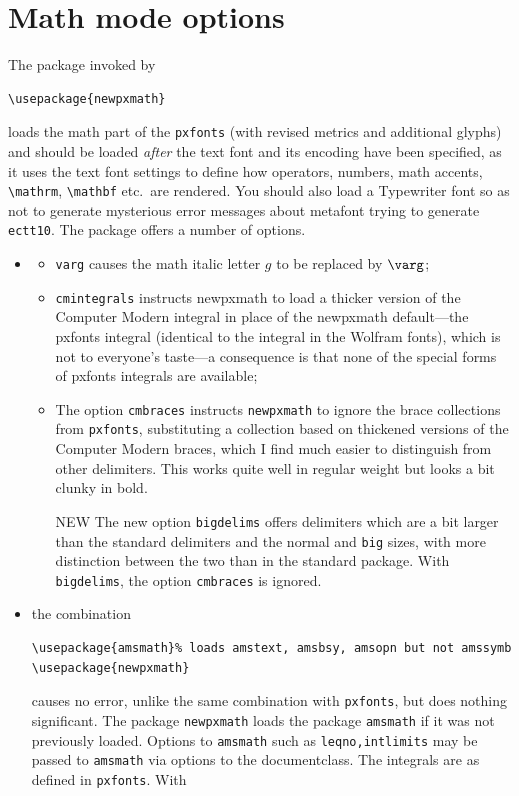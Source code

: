 \documentclass[11pt]{article}
\begin{document}
\section{Math mode options}
The package invoked by
\begin{verbatim}
\usepackage{newpxmath}
\end{verbatim}
loads the math part of the {\tt pxfonts} (with revised metrics and additional glyphs) and should be loaded \emph{after} the text font and its encoding have been specified, as it uses the text font settings to define how operators, numbers, math accents, \verb|\mathrm|, \verb|\mathbf| etc.\ are rendered. You should also load a Typewriter font so as not to generate mysterious error messages about \textsf{metafont} trying to generate \texttt{ectt10}. The package offers a number of options.
\begin{itemize}
\item 
\begin{itemize}
\item{\tt varg} causes the math italic letter $g$ to be replaced by $\varg$;
\item{\tt cmintegrals} instructs \textsf{newpxmath} to load a thicker version of the Computer Modern integral in place of the \textsf{newpxmath} default---the pxfonts integral (identical to the integral in the Wolfram fonts), which is not to everyone's taste---a consequence is that none of the special forms of \textsf{pxfonts} integrals are available;
\item The option {\tt cmbraces} instructs {\tt newpxmath} to ignore the brace collections from {\tt pxfonts}, substituting a collection based on thickened versions of the Computer Modern braces, which I find much easier to distinguish from other delimiters. This works quite well in regular weight but looks a bit clunky in bold.
\item [NEW] The new option {\tt bigdelims} offers delimiters which are a bit larger than the standard delimiters and the normal and {\tt big} sizes, with more distinction between the two than in the standard package. With {\tt bigdelims}, the option {\tt cmbraces} is ignored.
\end{itemize}
\item the combination
\begin{verbatim}
\usepackage{amsmath}% loads amstext, amsbsy, amsopn but not amssymb
\usepackage{newpxmath}
\end{verbatim}
causes no error, unlike the same combination with {\tt pxfonts}, but does nothing significant. The package {\tt newpxmath} loads the package {\tt amsmath} if it was not previously loaded. Options to {\tt amsmath} such as {\tt leqno,intlimits} may be passed to {\tt amsmath} via options to the documentclass. The integrals are as defined in {\tt pxfonts}. With

\end{itemize}
\end{document}
